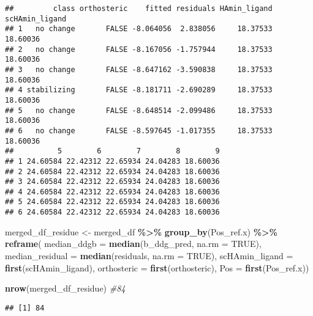\documentclass[
]{article}
\newenvironment{Shaded}{\begin{snugshade}}{\end{snugshade}}
\newcommand{\AttributeTok}[1]{\textcolor[rgb]{0.13,0.29,0.53}{#1}}
\newcommand{\CommentTok}[1]{\textcolor[rgb]{0.56,0.35,0.01}{\textit{#1}}}
\newcommand{\ConstantTok}[1]{\textcolor[rgb]{0.56,0.35,0.01}{#1}}
\newcommand{\FunctionTok}[1]{\textcolor[rgb]{0.13,0.29,0.53}{\textbf{#1}}}
\newcommand{\NormalTok}[1]{#1}
\newcommand{\OtherTok}[1]{\textcolor[rgb]{0.56,0.35,0.01}{#1}}
\newcommand{\SpecialCharTok}[1]{\textcolor[rgb]{0.81,0.36,0.00}{\textbf{#1}}}
\newcommand{\StringTok}[1]{\textcolor[rgb]{0.31,0.60,0.02}{#1}}
\begin{document}
\begin{verbatim}
##         class orthosteric    fitted residuals HAmin_ligand scHAmin_ligand
## 1   no change       FALSE -8.064056  2.838056     18.37533       18.60036
## 2   no change       FALSE -8.167056 -1.757944     18.37533       18.60036
## 3   no change       FALSE -8.647162 -3.590838     18.37533       18.60036
## 4 stabilizing       FALSE -8.181711 -2.690289     18.37533       18.60036
## 5   no change       FALSE -8.648514 -2.099486     18.37533       18.60036
## 6   no change       FALSE -8.597645 -1.017355     18.37533       18.60036
##          5        6        7        8        9
## 1 24.60584 22.42312 22.65934 24.04283 18.60036
## 2 24.60584 22.42312 22.65934 24.04283 18.60036
## 3 24.60584 22.42312 22.65934 24.04283 18.60036
## 4 24.60584 22.42312 22.65934 24.04283 18.60036
## 5 24.60584 22.42312 22.65934 24.04283 18.60036
## 6 24.60584 22.42312 22.65934 24.04283 18.60036
\end{verbatim}

\begin{Shaded}
\begin{Highlighting}[]
\NormalTok{merged\_df\_residue }\OtherTok{\textless{}{-}}\NormalTok{ merged\_df }\SpecialCharTok{\%\textgreater{}\%}
  \FunctionTok{group\_by}\NormalTok{(Pos\_ref.x) }\SpecialCharTok{\%\textgreater{}\%}
  \FunctionTok{reframe}\NormalTok{(}
    \AttributeTok{median\_ddgb =} \FunctionTok{median}\NormalTok{(b\_ddg\_pred, }\AttributeTok{na.rm =} \ConstantTok{TRUE}\NormalTok{),}
    \AttributeTok{median\_residual =} \FunctionTok{median}\NormalTok{(residuals, }\AttributeTok{na.rm =} \ConstantTok{TRUE}\NormalTok{),}
    \AttributeTok{scHAmin\_ligand =} \FunctionTok{first}\NormalTok{(scHAmin\_ligand),}
    \AttributeTok{orthosteric =} \FunctionTok{first}\NormalTok{(orthosteric),}
    \AttributeTok{Pos =} \FunctionTok{first}\NormalTok{(Pos\_ref.x))}

\FunctionTok{nrow}\NormalTok{(merged\_df\_residue) }\CommentTok{\#84}
\end{Highlighting}
\end{Shaded}

\begin{verbatim}
## [1] 84
\end{verbatim}

\begin{Shaded}
\end{Shaded}
\end{document}
